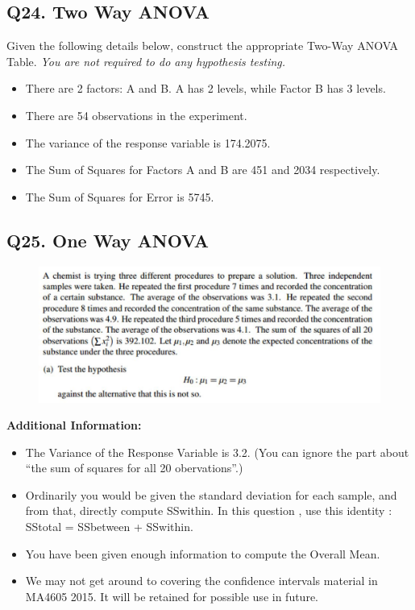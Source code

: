 \documentclass[a4paper,12pt]{article}
\begin{document}
\newpage
\subsection*{Q24. Two Way ANOVA }
Given the following details below, construct the appropriate Two-Way ANOVA Table. \textit{You are not required to do any hypothesis testing.}

\begin{itemize}
	\item There are 2 factors: A and B. A has 2 levels, while Factor B has 3 levels.
	\item There are 54 observations in the experiment.
	\item The variance of the response variable is 174.2075.
	\item The Sum of Squares for Factors A and B are 451  and  2034 respectively.
	\item The Sum of Squares for Error is 5745.
\end{itemize}


\newpage

\subsection*{Q25. One Way ANOVA }
\begin{figure}[h!]
	\centering
	\includegraphics[width=0.7\linewidth]{image/Q24review1}
	
\end{figure}

\noindent \textbf{Additional Information: }
\begin{itemize}
	\item The Variance of the Response Variable is 3.2. (You can ignore the part about “the sum of squares for all 20 obervations”.)
	\item  Ordinarily you would be given the standard deviation for each sample, and from that, directly compute SSwithin. In this question , use this identity : SStotal = SSbetween + SSwithin.
	\item  You have been given enough information to compute the Overall Mean.
	\item  We may not get around to covering the confidence intervals material in MA4605 2015. It will be retained for possible use in future.
\end{itemize}
\newpage
\end{document}

